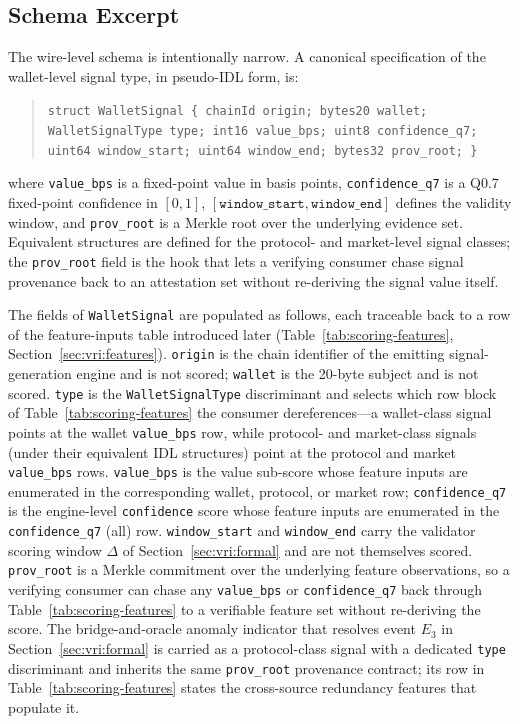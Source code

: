 \documentclass[journal]{IEEEtran}
\begin{document}
\subsection{Schema Excerpt}

The wire-level schema is intentionally narrow. A canonical
specification of the wallet-level signal type, in pseudo-IDL form,
is:
\begin{quote}\small
\texttt{struct WalletSignal \{ chainId origin; bytes20 wallet;
WalletSignalType type; int16 value\_bps; uint8 confidence\_q7; uint64
window\_start; uint64 window\_end; bytes32 prov\_root; \}}
\end{quote}
\noindent
where \texttt{value\_bps} is a fixed-point value in basis points,
\texttt{confidence\_q7} is a Q0.7 fixed-point confidence in $[0,1]$,
$[\texttt{window\_start}, \texttt{window\_end}]$ defines the validity
window, and \texttt{prov\_root} is a Merkle root over the underlying
evidence set. Equivalent structures are defined for the protocol- and
market-level signal classes; the \texttt{prov\_root} field is the hook
that lets a verifying consumer chase signal provenance back to an
attestation set without re-deriving the signal value itself.

The fields of \texttt{WalletSignal} are populated as follows, each
traceable back to a row of the feature-inputs table introduced later
(Table~\ref{tab:scoring-features}, Section~\ref{sec:vri:features}).
\texttt{origin} is the chain identifier of the emitting
signal-generation engine and is not scored; \texttt{wallet} is the
20-byte subject and is not scored. \texttt{type} is the
\texttt{WalletSignalType} discriminant and selects which row block of
Table~\ref{tab:scoring-features} the consumer dereferences---a
wallet-class signal points at the wallet \texttt{value\_bps} row,
while protocol- and market-class signals (under their equivalent IDL
structures) point at the protocol and market \texttt{value\_bps}
rows. \texttt{value\_bps} is the value sub-score whose feature inputs
are enumerated in the corresponding wallet, protocol, or market row;
\texttt{confidence\_q7} is the engine-level \texttt{confidence} score
whose feature inputs are enumerated in the
\texttt{confidence\_q7} (all) row. \texttt{window\_start} and
\texttt{window\_end} carry the validator scoring window $\Delta$ of
Section~\ref{sec:vri:formal} and are not themselves scored.
\texttt{prov\_root} is a Merkle commitment over the underlying feature
observations, so a verifying consumer can chase any \texttt{value\_bps}
or \texttt{confidence\_q7} back through Table~\ref{tab:scoring-features}
to a verifiable feature set without re-deriving the score. The
bridge-and-oracle anomaly indicator that resolves event $E_3$ in
Section~\ref{sec:vri:formal} is carried as a protocol-class signal
with a dedicated \texttt{type} discriminant and inherits the same
\texttt{prov\_root} provenance contract; its row in
Table~\ref{tab:scoring-features} states the cross-source redundancy
features that populate it.
\end{document}
